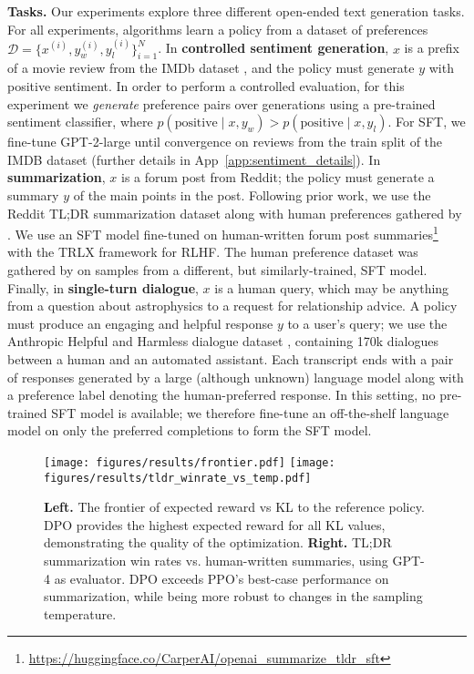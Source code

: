 \textbf{Tasks.} Our experiments explore three different open-ended text generation tasks. For all experiments, algorithms learn a policy from a dataset of preferences $\mathcal{D}=\bigl\{x^{(i)}, y_w^{(i)}, y_l^{(i)}\bigr\}_{i=1}^N$. In \textbf{controlled sentiment generation}, $x$ is a prefix of a movie review from the IMDb dataset \cite{maas-EtAl:2011:ACL-HLT2011}, and the policy must generate $y$ with positive sentiment. In order to perform a controlled evaluation, for this experiment we \textit{generate} preference pairs over generations using a pre-trained sentiment classifier, where $p(\text{positive}\mid x,y_w)>p(\text{positive}\mid x,y_l)$. For SFT, we fine-tune GPT-2-large until convergence on reviews from the train split of the IMDB dataset (further details in App~\ref{app:sentiment_details}). In \textbf{summarization}, $x$ is a forum post from Reddit; the policy must generate a summary $y$ of the main points in the post. Following prior work, we use the Reddit TL;DR summarization dataset \citep{volske-etal-2017-tl} along with human preferences gathered by \citeauthor{stiennon2022learning}. We use an SFT model fine-tuned on human-written forum post summaries\footnote{\url{https://huggingface.co/CarperAI/openai_summarize_tldr_sft}} with the TRLX \citep{leandro_von_werra_2023_7790115} framework for RLHF. The human preference dataset was gathered by \citeauthor{stiennon2022learning} on samples from a different, but similarly-trained, SFT model. Finally, in \textbf{single-turn dialogue}, 
$x$ is a human query, which may be anything from a question about astrophysics to a request for relationship advice. A policy must produce an engaging and helpful response $y$ to a user's query; we use the Anthropic Helpful and Harmless dialogue dataset \citep{bai2022training}, containing 170k dialogues between a human and an automated assistant. Each transcript ends with a pair of responses generated by a large (although unknown) language model along with a preference label denoting the human-preferred response. In this setting, no pre-trained SFT model is available; we therefore fine-tune an off-the-shelf language model on only the preferred completions to form the SFT model.

\begin{figure}
    \centering
    \texttt{[image: figures/results/frontier.pdf]}
    \texttt{[image: figures/results/tldr\_winrate\_vs\_temp.pdf]}
    \caption{\textbf{Left.} The frontier of expected reward vs KL to the reference policy. DPO provides the highest expected reward for all KL values, demonstrating the quality of the optimization. \textbf{Right.} TL;DR summarization win rates vs. human-written summaries, using GPT-4 as evaluator. DPO exceeds PPO's best-case performance on summarization, while being more robust to changes in the sampling temperature.}
    \vspace{-2mm}
    \label{fig:frontier-tldr-main}
\end{figure}

